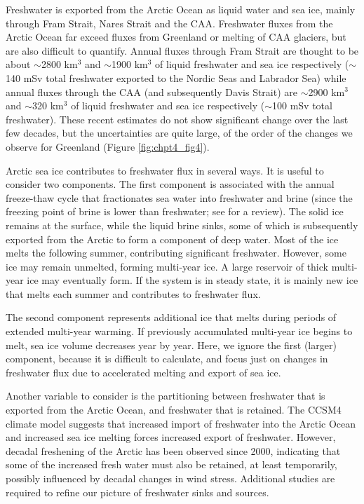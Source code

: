 Freshwater is exported from the Arctic Ocean as liquid water and sea ice, mainly through Fram Strait, Nares Strait and the CAA. Freshwater fluxes from the Arctic Ocean far exceed fluxes from Greenland or melting of CAA glaciers, but are also difficult to quantify. Annual fluxes through Fram Strait are thought to be about  $\sim$2800 km$^{3}$ and $\sim$1900 km$^{3}$ of liquid freshwater and sea ice respectively ($\sim$140 mSv total freshwater exported to the Nordic Seas and Labrador Sea) while annual fluxes through the CAA (and subsequently Davis Strait) are $\sim$2900 km$^{3}$ and $\sim$320 km$^{3}$ of liquid freshwater and sea ice respectively ($\sim$100 mSv total freshwater)\cite[]{haine2015arctic}.   These recent estimates do not show significant change over the last few decades, but the uncertainties are quite large, of the order of the changes we observe for Greenland (Figure \ref{fig:chpt4_fig4}). 

Arctic sea ice contributes to freshwater flux in several ways.  It is useful to consider two components.  The first component is associated with the annual freeze-thaw cycle that fractionates sea water into freshwater and brine (since the freezing point of brine is lower than freshwater; see \citet{aagaard1989role} for a review).  The solid ice remains at the surface, while the liquid brine sinks, some of which is subsequently exported from the Arctic to form a component of deep water.  Most of the ice melts the following summer, contributing significant freshwater.  However, some ice may remain unmelted, forming multi-year ice.  A large reservoir of thick multi-year ice may eventually form.  If the system is in steady state, it is mainly new ice that melts each summer and contributes to freshwater flux. 

The second component represents additional ice that melts during periods of extended multi-year warming.  If previously accumulated multi-year ice begins to melt, sea ice volume decreases year by year.  Here, we ignore the first (larger) component, because it is difficult to calculate, and focus just on changes in freshwater flux due to accelerated melting and export of sea ice. 

Another variable to consider is the partitioning between freshwater that is exported from the Arctic Ocean, and freshwater that is retained. The CCSM4 climate model suggests that increased import of freshwater into the Arctic Ocean and increased sea ice melting forces increased export of freshwater\cite[]{vavrus2012twenty}.  However, decadal freshening of the Arctic has been observed since 2000, indicating that some of the increased fresh water must also be retained, at least temporarily, possibly influenced by decadal changes in wind stress\cite[]{haine2015arctic,proshutinsky2015arctic}. Additional studies are required to refine our picture of freshwater sinks and sources.


